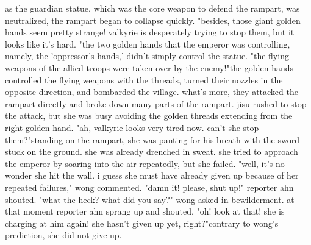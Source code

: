 as the guardian statue, which was the core weapon to defend the rampart, was neutralized, the rampart began to collapse quickly.
"besides, those giant golden hands seem pretty strange! valkyrie is desperately trying to stop them, but it looks like it's hard.
"the two golden hands that the emperor was controlling, namely, the 'oppressor's hands,' didn't simply control the statue.
"the flying weapons of the allied troops were taken over by the enemy!"the golden hands controlled the flying weapons with the threads, turned their nozzles in the opposite direction, and bombarded the village.
 what's more, they attacked the rampart directly and broke down many parts of the rampart.
jisu rushed to stop the attack, but she was busy avoiding the golden threads extending from the right golden hand.
"ah, valkyrie looks very tired now.
 can't she stop them?"standing on the rampart, she was panting for his breath with the sword stuck on the ground.
she was already drenched in sweat.
 she tried to approach the emperor by soaring into the air repeatedly, but she failed.
"well, it's no wonder she hit the wall.
 i guess she must have already given up because of her repeated failures," wong commented.
"damn it! please, shut up!" reporter ahn shouted.
"what the heck? what did you say?" wong asked in bewilderment.
at that moment reporter ahn sprang up and shouted, "oh! look at that! she is charging at him again! she hasn't given up yet, right?"contrary to wong's prediction, she did not give up.


 